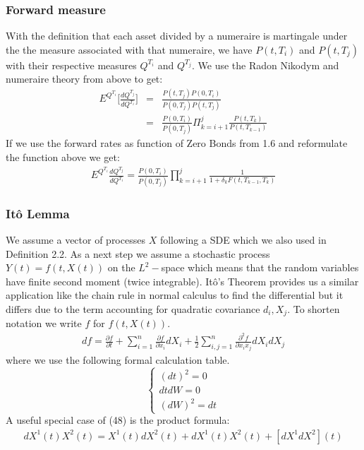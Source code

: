 \documentclass[11pt]{article}
\numberwithin{equation}{subsection}
\begin{document}
\subsubsection{Forward measure}		
With the definition that each asset divided by a numeraire is martingale under the the measure associated with that numeraire, we have \(P(t, T_i)\) and \(P(t, T_j)\) with their respective measures \(Q^{T_i}\) and \(Q^{T_j}\). We use the Radon Nikodym and numeraire theory from above to get:
\begin{eqnarray}
	E^{Q^{T_i}}\bigg[\frac{dQ^{T_j}}{dQ^{T_i}}\bigg] &=& \frac{P(t, T_j) P(0, T_i)}{P(0, T_j) P(t, T_j)} \\
	&=& \frac{P(0, T_i)}{P(0, T_j)} \Pi_{k=i+1}^{j} \frac{P(t, T_{k})}{P(t, T_{k-1})}
\end{eqnarray}
If we use the forward rates as function of Zero Bonds from 1.6 and reformulate the function above we get:
\begin{eqnarray}
E^{Q^{T_i}}\frac{dQ^{T_j}}{dQ^{T_i}} = \frac{P(0, T_i)}{P(0, T_j)} \prod_{k=i+1}^{j} \frac{1}{1+\delta_{k}F(t, T_{k-1}, T_{k})}
\end{eqnarray}
\subsubsection{Itô Lemma}		
We assume a vector of processes \(X\) following a SDE which we also used in Definition 2.2. As a next step we assume a stochastic process \(Y(t)= f(t, X(t))\) on the \(L^2-\)space which means that the random variables have finite second moment (twice integrable). Itô's Theorem provides us a similar application like the chain rule in normal calculus to find the differential but it differs due to the term accounting for quadratic covariance 
\(d_i, X_j\). To shorten notation we write \(f\) for \(f(t, X(t))\).
\begin{eqnarray}
	df = \frac{\partial f}{\partial t} + \sum_{i=1}^{n} \frac{\partial f}{\partial x_i} dX_i + \frac{1}{2} \sum_{i, j=1}^{n} \frac{\partial^2 f}{\partial x_i x_j} dX_i dX_j
\end{eqnarray}
where we use the following formal calculation table.
\begin{displaymath}
\left\{\begin{array}{lll}
(dt)^2 = 0 \\
dt dW = 0 \\
(dW)^2 = dt
\end{array} \right.
\end{displaymath}
A useful special case of (48) is the product formula:
\begin{eqnarray}
	dX^{1}(t)X^{2}(t) = X^{1}(t)dX^{2}(t) + dX^{1}(t)X^{2}(t) + [dX^{1}dX^{2}](t)
\end{eqnarray}
\end{document}
